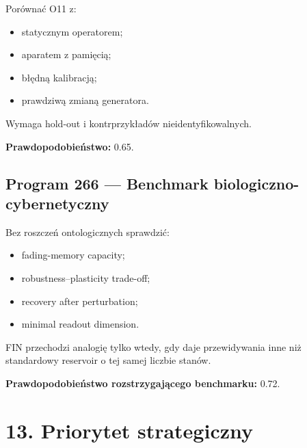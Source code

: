 \documentclass[11pt,a4paper,openany]{report}
\begin{document}
Porównać O11 z:

\begin{itemize}
\item 
statycznym operatorem;

\item 
aparatem z pamięcią;

\item 
błędną kalibracją;

\item 
prawdziwą zmianą generatora.

\end{itemize}

Wymaga hold-out i kontrprzykładów nieidentyfikowalnych.

\textbf{Prawdopodobieństwo:} 0.65.

\section{Program 266 --- Benchmark biologiczno-cybernetyczny}

Bez roszczeń ontologicznych sprawdzić:

\begin{itemize}
\item 
fading-memory capacity;

\item 
robustness--plasticity trade-off;

\item 
recovery after perturbation;

\item 
minimal readout dimension.

\end{itemize}

FIN przechodzi analogię tylko wtedy, gdy daje przewidywania inne ni\.z standardowy reservoir o tej samej liczbie stanów.

\textbf{Prawdopodobieństwo rozstrzygającego benchmarku:} 0.72.

\chapter{13. Priorytet strategiczny}
\end{document}

